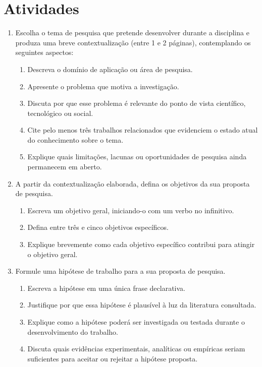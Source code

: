 \documentclass[10pt,a4paper]{extarticle}
\begin{document}
\section*{Atividades}

\begin{enumerate}[label=\textbf{\arabic*.}]

\item Escolha o tema de pesquisa que pretende desenvolver durante a disciplina e produza uma breve contextualização (entre 1 e 2 páginas), contemplando os seguintes aspectos:

\begin{enumerate}[label=(\alph*)]
    \item Descreva o domínio de aplicação ou área de pesquisa.
    \item Apresente o problema que motiva a investigação.
    \item Discuta por que esse problema é relevante do ponto de vista científico, tecnológico ou social.
    \item Cite pelo menos três trabalhos relacionados que evidenciem o estado atual do conhecimento sobre o tema.
    \item Explique quais limitações, lacunas ou oportunidades de pesquisa ainda permanecem em aberto.
\end{enumerate}

\item A partir da contextualização elaborada, defina os objetivos da sua proposta de pesquisa.

\begin{enumerate}[label=(\alph*)]
    \item Escreva um objetivo geral, iniciando-o com um verbo no infinitivo.
    \item Defina entre três e cinco objetivos específicos.
    \item Explique brevemente como cada objetivo específico contribui para atingir o objetivo geral.
\end{enumerate}

\item Formule uma hipótese de trabalho para a sua proposta de pesquisa.

\begin{enumerate}[label=(\alph*)]
    \item Escreva a hipótese em uma única frase declarativa.
    \item Justifique por que essa hipótese é plausível à luz da literatura consultada.
    \item Explique como a hipótese poderá ser investigada ou testada durante o desenvolvimento do trabalho.
    \item Discuta quais evidências experimentais, analíticas ou empíricas seriam suficientes para aceitar ou rejeitar a hipótese proposta.
\end{enumerate}


\end{enumerate}
\end{document}
